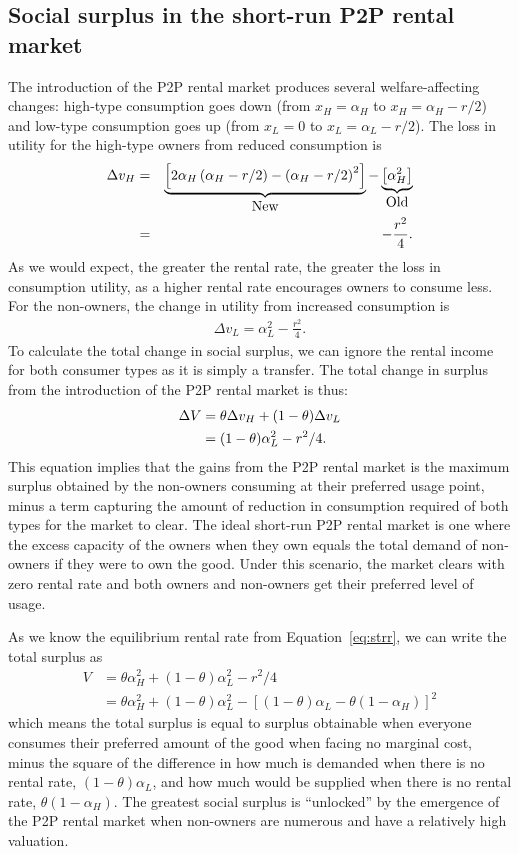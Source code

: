 \documentclass[11pt]{article}
\begin{document}
\subsection{Social surplus in the short-run P2P rental market}
The introduction of the P2P rental market produces several welfare-affecting changes: 
high-type consumption goes down (from $x_H = \alpha_H$ to  $x_H = \alpha_H - r/2$) and low-type consumption goes up (from $x_L = 0$ to $x_L = \alpha_L - r/2$). 
The loss in utility for the high-type owners from reduced consumption is 
\begin{eqnarray}
\Delta v_H &=& \underbrace{\left[2 \alpha_H \left(\alpha_H - r/2\right) - \left(\alpha_H - r/2\right)^2 \right]}_{\mbox{New}} - 
                             \underbrace{\left[\alpha_H^2 \right]}_{\mbox{Old}}   \notag \\
           &=& - \frac{r^2}{4}. 
\end{eqnarray} 
As we would expect, the greater the rental rate, the greater the loss
in consumption utility, as a higher rental rate encourages owners to consume less. 
For the non-owners, the change in utility from increased consumption is
\begin{align}
\Delta v_L = \alpha_L^2 - \frac{r^2}{4}. 
\end{align} 
To calculate the total change in social surplus, we can ignore the rental income for both consumer types as it is simply a transfer. 
The total change in surplus from the introduction of the P2P rental market is thus: 
\begin{align}
\Delta V &= \theta \Delta v_H + (1-\theta) \Delta v_L \notag \\ 
         & = (1-\theta) \alpha_L^2 - r^2/4.
\end{align}
This equation implies that the gains from the P2P rental market is the maximum surplus obtained by the non-owners consuming at their preferred usage point, minus a term capturing the amount of reduction in consumption required of both types for the market to clear.
The ideal short-run P2P rental market is one where the excess capacity of the owners when they own equals the total demand of non-owners if they were to own the good.
Under this scenario, the market clears with zero rental rate and both owners and non-owners get their preferred level of usage. 

As we know the equilibrium rental rate from Equation~\ref{eq:strr}, we can write the total surplus as
\begin{align}
  V & = \theta \alpha_H^2 + (1-\theta)\alpha_L^2 - r^2/4 \\
    & = \theta \alpha_H^2 + (1-\theta)\alpha_L^2 - \left[(1-\theta) \alpha_L - \theta (1-\alpha_H) \right]^2
\end{align} 
which means the total surplus is equal to surplus obtainable when everyone consumes their preferred amount of the good when facing no marginal cost, minus the square of the difference in how much is demanded when there is no rental rate, $(1-\theta)\alpha_L$, and how much would be supplied when there is no rental rate, $\theta (1-\alpha_H)$.
The greatest social surplus is ``unlocked'' by the emergence of the P2P rental market when non-owners are numerous and have a relatively high valuation. 
\end{document}
